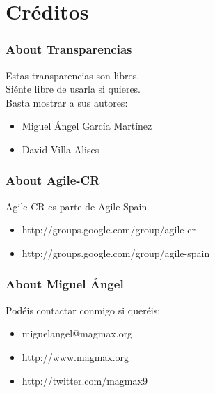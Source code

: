 \section{Créditos}

 \begin{frame}
  \frametitle{About Transparencias}
  \only<+> {
  Estas transparencias son libres. \\
  Siénte libre de usarla si quieres.\\
  Basta mostrar a sus autores:

  \begin{itemize}
   \item Miguel Ángel García Martínez
   \item David Villa Alises
  \end{itemize}
  }
 \end{frame}


 \begin{frame}
  \frametitle{About Agile-CR}
  Agile-CR es parte de Agile-Spain
  \begin{itemize}
   \item<+-> http://groups.google.com/group/agile-cr
   \item<+-> http://groups.google.com/group/agile-spain
  \end{itemize}
 \end{frame}

 \begin{frame}
  \frametitle{About Miguel Ángel}
  Podéis contactar conmigo si queréis:

  \begin{itemize}
   \item<+-> miguelangel@magmax.org
   \item<+-> http://www.magmax.org
   \item<+-> http://twitter.com/magmax9
  \end{itemize}
 \end{frame}
